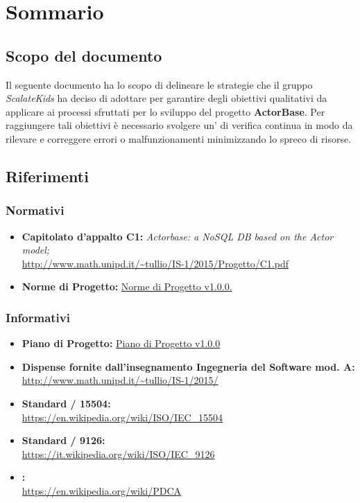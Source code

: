 \documentclass{scalatekids-article}
\begin{document}
\section{Sommario}
\subsection{Scopo del documento}
Il seguente documento ha lo scopo di delineare le strategie che il gruppo \textit{ScalateKids} ha deciso di adottare per garantire degli obiettivi qualitativi da applicare ai processi sfruttati per lo sviluppo del progetto \textbf{ActorBase}. Per raggiungere tali obiettivi è necessario svolgere un' di verifica continua in modo da rilevare e correggere errori o malfunzionamenti minimizzando lo spreco di risorse.
\prodPurpose
\glossExpl
\subsection{Riferimenti}
\subsubsection{Normativi}
\begin{itemize}
\item\textbf{Capitolato d'appalto C1:} \textit{Actorbase: a NoSQL DB based on the Actor model;}\\
  \url{http://www.math.unipd.it/~tullio/IS-1/2015/Progetto/C1.pdf}
\item\textbf{Norme di Progetto:} \href{run:../Interni/NormeDiProgetto\_v1.0.0.pdf}{Norme di Progetto v1.0.0.}
\end{itemize}
\subsubsection{Informativi}
\begin{itemize}
\item\textbf{Piano di Progetto:} \href{run:./PianoDiProgetto\_v1.0.0.pdf}{Piano di Progetto v1.0.0}
\item\textbf{Dispense fornite dall'insegnamento Ingegneria del Software mod. A:}\\
  \url{http://www.math.unipd.it/~tullio/IS-1/2015/}
\item\textbf{Standard / 15504:}\\
\url{https://en.wikipedia.org/wiki/ISO/IEC_15504}
\item\textbf{Standard / 9126:}\\
\url{https://it.wikipedia.org/wiki/ISO/IEC_9126}
\item\textbf{:}\\
\url{https://en.wikipedia.org/wiki/PDCA}
\end{itemize}
\newpage
\end{document}
